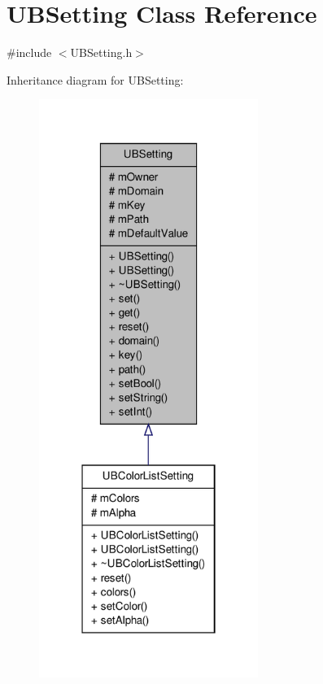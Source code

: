 \hypertarget{class_u_b_setting}{\section{U\-B\-Setting Class Reference}
\label{d7/d24/class_u_b_setting}
}


{\ttfamily \#include $<$U\-B\-Setting.\-h$>$}



Inheritance diagram for U\-B\-Setting\-:
\nopagebreak
\begin{figure}[H]
\begin{center}
\leavevmode
\includegraphics[width=202pt]{d9/d8d/class_u_b_setting__inherit__graph}
\end{center}
\end{figure}


